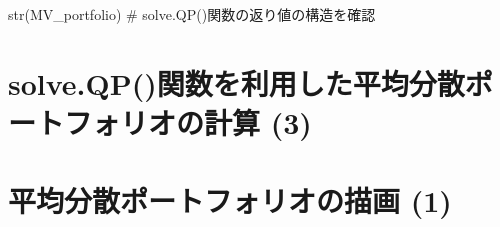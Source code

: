 \documentclass[
  letterpaper,
  DIV=11,
  numbers=noendperiod]{scrreprt}
\newenvironment{Shaded}{\begin{snugshade}}{\end{snugshade}}
\newcommand{\CommentTok}[1]{\textcolor[rgb]{0.37,0.37,0.37}{#1}}
\newcommand{\DecValTok}[1]{\textcolor[rgb]{0.68,0.00,0.00}{#1}}
\newcommand{\FunctionTok}[1]{\textcolor[rgb]{0.28,0.35,0.67}{#1}}
\newcommand{\NormalTok}[1]{\textcolor[rgb]{0.00,0.23,0.31}{#1}}
\newcommand{\OtherTok}[1]{\textcolor[rgb]{0.00,0.23,0.31}{#1}}
\newcommand{\SpecialCharTok}[1]{\textcolor[rgb]{0.37,0.37,0.37}{#1}}
\begin{document}
\begin{Shaded}
\begin{Highlighting}[]
\FunctionTok{str}\NormalTok{(MV\_portfolio) }\CommentTok{\# solve.QP()関数の返り値の構造を確認}
\end{Highlighting}
\end{Shaded}

\section{solve.QP()関数を利用した平均分散ポートフォリオの計算
(3)}\label{solve.qpux95a2ux6570ux3092ux5229ux7528ux3057ux305fux5e73ux5747ux5206ux6563ux30ddux30fcux30c8ux30d5ux30a9ux30eaux30aaux306eux8a08ux7b97-3}

\begin{Shaded}
\end{Shaded}

\section{平均分散ポートフォリオの描画
(1)}\label{ux5e73ux5747ux5206ux6563ux30ddux30fcux30c8ux30d5ux30a9ux30eaux30aaux306eux63cfux753b-1}
\end{document}
